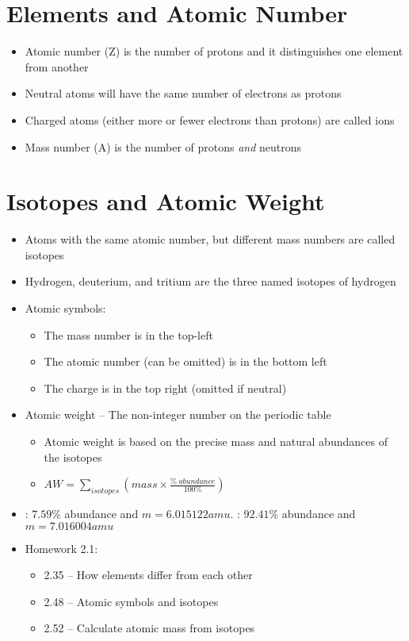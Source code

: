 \documentclass[12pt, openany, letterpaper]{memoir}
\begin{document}
\section{Elements and Atomic Number}
\begin{itemize}
	\item Atomic number (Z) is the number of protons and it distinguishes one element from another
	\item Neutral atoms will have the same number of electrons as protons
	\item Charged atoms (either more or fewer electrons than protons) are called ions
	\item Mass number (A) is the number of protons \emph{and} neutrons	
\end{itemize}
\section{Isotopes and Atomic Weight}
\begin{itemize}
	\item Atoms with the same atomic number, but different mass numbers are called isotopes
	\item Hydrogen, deuterium, and tritium are the three named isotopes of hydrogen
	\item Atomic symbols: 
	\begin{itemize}
		\item The mass number is in the top-left
		\item The atomic number (can be omitted) is in the bottom left
		\item The charge is in the top right (omitted if neutral)
	\end{itemize}
	\item Atomic weight -- The non-integer number on the periodic table
	\begin{itemize}
		\item Atomic weight is based on the precise mass and natural abundances of the isotopes
		\item $AW=\sum\limits_{isotopes}\left(mass\times \frac{\%~abundance}{100\%}\right)$
	\end{itemize}
	\item {}: $7.59\%$ abundance and $m=6.015122amu$. : $92.41\%$ abundance and $m=7.016004amu$
	\item Homework 2.1:
	\begin{itemize}
		\item 2.35 -- How elements differ from each other
		\item 2.48 -- Atomic symbols and isotopes
		\item 2.52 -- Calculate atomic mass from isotopes
	\end{itemize}
\end{itemize}
\end{document}
